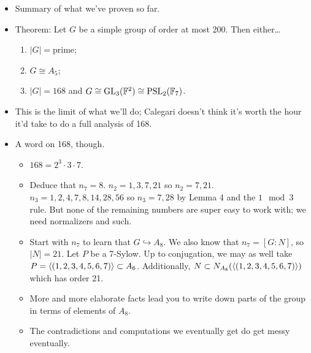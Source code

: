 \documentclass[../notes.tex]{subfiles}
\begin{document}
\begin{itemize}
\begin{proof}
        $n_3\mid 20$ and $n_3\equiv 1\mod 3$ yields $n_3=1,4,20$. $n_3=1$ is normal, 4 invokes lemma 4, so $n_3=20$.\par
        Case 1: $P\cap Q=\{e\}$. Then the number of elements of order 3 or 9 is $n_3(9-1)=160$. Contradiction (too many elements).\par
        Case 2: $P\cap Q=C$, $|C|=3$. Take $N=N_G(C)$. So once again, we have $9\mid|N|\mid 180$ and $|N|>9$. Thus, $|N|=18,36,45,90,180$. $|N|=180$ gives us $C\triangleleft G$ again. $|N|=90,45$ yields $[G:N]=2,4$ again. This leaves us with 18,36. We can't have 2 3-Sylows, so $|N|=36$. Thus, $[G:N]=5$. This induces $G\hookrightarrow A_5$, but $G$ is too big; $G\nleq A_5$, a contradiction.
    \end{proof}
    \item Summary of what we've proven so far.
    \item Theorem: Let $G$ be a simple group of order at most 200. Then either\dots
    \begin{enumerate}
        \item $|G|=\text{prime}$;
        \item $G\cong A_5$;
        \item $|G|=168$ and $G\cong\text{GL}_3(\mathbb{F}^2)\cong\text{PSL}_2(\mathbb{F}_7)$.
    \end{enumerate}
    \item This is the limit of what we'll do; Calegari doesn't think it's worth the hour it'd take to do a full analysis of 168.
    \item A word on 168, though.
    \begin{itemize}
        \item $168=2^3\cdot 3\cdot 7$.
        \item Deduce that $n_7=8$. $n_2=1,3,7,21$ so $n_2=7,21$. $n_3=1,2,4,7,8,14,28,56$ so $n_3=7,28$ by Lemma 4 and the $1\mod 3$ rule. But none of the remaining numbers are super easy to work with; we need normalizers and such.
        \item Start with $n_7$ to learn that $G\hookrightarrow A_8$. We also know that $n_7=[G:N]$, so $|N|=21$. Let $P$ be a 7-Sylow. Up to conjugation, we may as well take $P=\left\langle{(1,2,3,4,5,6,7)}\right\rangle\subset A_6$. Additionally, $N\subset N_{A_8}(\left\langle{(1,2,3,4,5,6,7)}\right\rangle)$ which has order 21.
        \item More and more elaborate facts lead you to write down parts of the group in terms of elements of $A_8$.
        \item The contradictions and computations we eventually get do get messy eventually.

\end{itemize}
\end{itemize}
\end{document}
